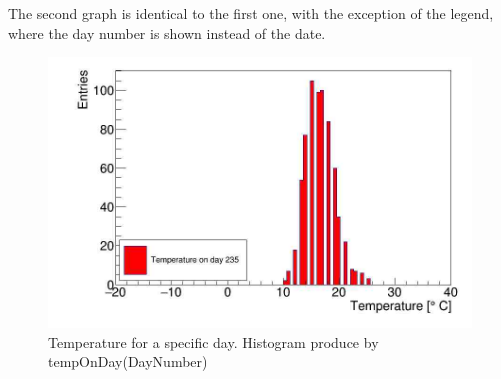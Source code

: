 The second graph is identical to the first one, with the exception of the legend, where the day number is shown instead of the date.

\begin{figure}[h]
\centering
\includegraphics[scale=0.3]{graph2.png}
\caption{Temperature for a specific day. Histogram produce by tempOnDay(DayNumber) }
\end{figure}